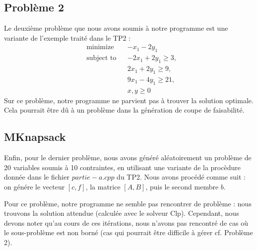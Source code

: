 \documentclass[a4paper]{article}
\begin{document}
\subsection{Problème 2}
Le deuxième problème que nous avons soumis à notre programme est une variante de l'exemple traité dans le TP2 :
\begin{equation}
\begin{aligned}
& {\text{minimize}}
& & -x_{1} - 2y_{1} \\
& \text{subject to}
& & -2x_{1} + 2y_{1} \geq 3, \\
& & & 2x_{1} + 2y_{1} \geq 9, \\
& & & 9x_{1} - 4y_{1} \geq 21, \\
& & & x, y \geq 0
\end{aligned}
\label{Pb2}
\end{equation}
Sur ce problème, notre programme ne parvient pas à trouver la solution optimale. Cela pourrait être dû à un problème dans la génération de coupe de faisabilité.

\subsection{MKnapsack}
Enfin, pour le dernier problème, nous avons généré aléatoirement un problème de 20 variables soumis à 10 contraintes, en utilisant une variante de la procèdure donnée dans le fichier $partie-a.cpp$ du TP2. Nous avons procédé comme suit : on génére le vecteur $[c,f]$, la matrice $[A,B]$, puis le second membre $b$.

Pour ce problème, notre programme ne semble pas rencontrer de problème : nous trouvons la solution attendue (calculée avec le solveur Clp). Cependant, nous devons noter qu'au cours de ces itérations, nous n'avons pas rencontré de cas où le sous-problème est non borné (cas qui pourrait être difficile à gérer cf. Problème 2).
\end{document}
